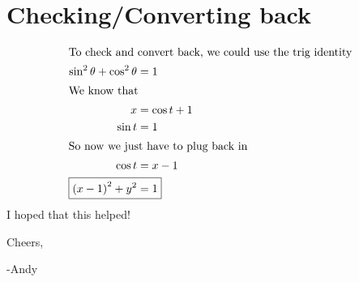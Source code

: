 \documentclass[12pt]{article}
\begin{document}
\section{Checking/Converting back}
\begin{align*}
\intertext{To check and convert back, we could use the trig identity}
\sin^{2}\theta+\cos^{2}\theta&=1\\
\intertext{We know that}
x&=\cos t+1\\
\sin t&=1\\
\intertext{So now we just have to plug back in}
\cos t&=x-1\\
  \Aboxed{\left(x-1\right)^{2}+y^{2}&=1}
\end{align*}
I hoped that this helped!

\bigskip
Cheers,

-Andy
\end{document}
